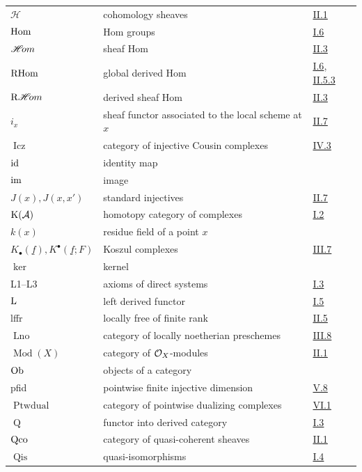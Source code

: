\begin{longtable}{@{}l p{8cm} l@{}}
	$\mathcal H$ & cohomology sheaves & \hyperref[sec:2.1]{II.1} \\
	$\operatorname{Hom}$ & Hom groups & \hyperref[sec:1.6]{I.6} \\
	$\mathop{\mathscr{H}\!om}\nolimits$ & sheaf Hom & \hyperref[sec:2.3]{II.3} \\
	$\operatorname{RHom}$ & global derived Hom & \hyperref[sec:1.6]{I.6}, \hyperref[prop:2.5.3]{II.5.3} \\
	$\mathop{\mathrm{R}\mathscr{H}\!om}\nolimits$ & derived sheaf Hom & \hyperref[sec:2.3]{II.3} \\
	$i_x$ & sheaf functor associated to the local scheme at $x$ & \hyperref[sec:2.7]{II.7} \\
	$\operatorname{Icz}$ & category of injective Cousin complexes & \hyperref[sec:4.3]{IV.3} \\
	$\operatorname{id}$ & identity map & \\
	$\operatorname{im}$ & image & \\
	$J(x),J(x,x')$ & standard injectives & \hyperref[sec:2.7]{II.7} \\
	$\operatorname{K}(\mathcal A)$ & homotopy category of complexes & \hyperref[sec:1.2]{I.2} \\
	$k(x)$ & residue field of a point $x$ & \\
	$K_\bullet(\underline{f}),K^\bullet(\underline{f};F)$ & Koszul complexes & \hyperref[sec:3.7]{III.7} \\
	$\ker$ & kernel & \\
	L1--L3 & axioms of direct systems & \hyperref[sec:1.3]{I.3} \\
	$\operatorname{L}$ & left derived functor & \hyperref[sec:1.5]{I.5} \\
	lffr & locally free of finite rank & \hyperref[sec:2.5]{II.5} \\
	$\operatorname{Lno}$ & category of locally noetherian preschemes & \hyperref[sec:3.8]{III.8} \\
	$\operatorname{Mod}(X)$ & category of $\mathcal{O}_X$-modules & \hyperref[sec:2.1]{II.1} \\
	$\operatorname{Ob}$ & objects of a category & \\
	pfid & pointwise finite injective dimension & \hyperref[sec:5.8]{V.8} \\
	$\operatorname{Ptwdual}$ & category of pointwise dualizing complexes & \hyperref[sec:6.1]{VI.1} \\
	$\operatorname{Q}$ & functor into derived category & \hyperref[sec:1.3]{I.3} \\
	$\operatorname{Qco}$ & category of quasi-coherent sheaves & \hyperref[sec:2.1]{II.1} \\
	$\operatorname{Qis}$ & quasi-isomorphisms & \hyperref[sec:1.4]{I.4} \\

\end{longtable}
